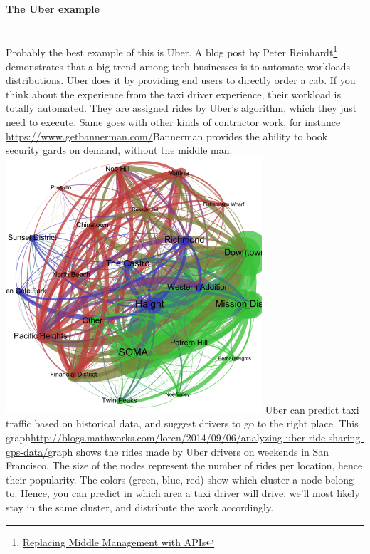 \documentclass[12pt]{article}
\begin{document}
\paragraph{The Uber example}
\\

Probably the best example of this is Uber. A blog post by Peter Reinhardt\footnote{\href{http://rein.pk/replacing-middle-management-with-apis/}{Replacing Middle Management with APIs}} demonstrates that a big trend among tech businesses is to automate workloads distributions. Uber does it by providing end users to directly order a cab. If you think about the experience from the taxi driver experience, their workload is totally automated. They are assigned rides by Uber's algorithm, which they just need to execute. Same goes with other kinds of contractor work, for instance \url{https://www.getbannerman.com/}{Bannerman} provides the ability to book security gards on demand, without the middle man.
\vspace{5mm}
\\
\includegraphics[width=\textwidth]{uber-graph}
Uber can predict taxi traffic based on historical data, and suggest drivers to go to the right place. This graph\url{http://blogs.mathworks.com/loren/2014/09/06/analyzing-uber-ride-sharing-gps-data/}{graph} shows the rides made by Uber drivers on weekends in San Francisco.
The size of the nodes represent the number of rides per location, hence their popularity.
The colors (green, blue, red) show which cluster a node belong to. Hence, you can predict in which area a taxi driver will drive: we'll most likely stay in the same cluster, and distribute the work accordingly.
\\
\end{document}
